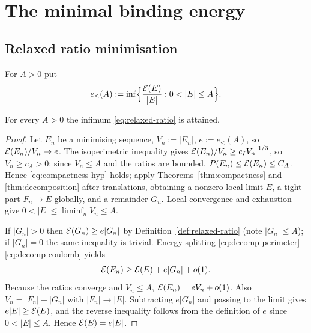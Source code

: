 \chapter{The minimal binding energy}\label{ch:binding}

\section{Relaxed ratio minimisation}

\begin{definition}\label{def:relaxed-ratio}
For $A>0$ put
\begin{equation}\label{eq:relaxed-ratio}
  e_\le(A):=\inf\Bigl\{\frac{\Ec(E)}{|E|}:0<|E|\le A\Bigr\}.
\end{equation}
\end{definition}

\begin{lemma}\label{lem:relaxed-attained}
For every $A>0$ the infimum \eqref{eq:relaxed-ratio} is attained.
\end{lemma}

\begin{proof}
Let $E_n$ be a minimising sequence, $V_n:=|E_n|$, $e:=e_\le(A)$, so
$\mathcal E(E_n)/V_n\to e$.  The isoperimetric inequality gives
$\mathcal E(E_n)/V_n\ge c_IV_n^{-1/3}$, so $V_n\ge c_A>0$; since $V_n\le A$ and the
ratios are bounded, $P(E_n)\le\mathcal E(E_n)\le C_A$.  Hence
\eqref{eq:compactness-hyp} holds; apply
Theorems~\ref{thm:compactness} and \ref{thm:decomposition} after translations,
obtaining a nonzero local limit $E$, a tight part $F_n\to E$ globally, and a
remainder $G_n$.  Local convergence and exhaustion give
$0<|E|\le\liminf_nV_n\le A$.

If $|G_n|>0$ then $\mathcal E(G_n)\ge e|G_n|$ by
Definition~\ref{def:relaxed-ratio} (note $|G_n|\le A$); if $|G_n|=0$ the same
inequality is trivial.  Energy splitting
\eqref{eq:decomp-perimeter}--\eqref{eq:decomp-coulomb} yields
\[
  \mathcal E(E_n)\ge\mathcal E(E)+e|G_n|+o(1).
\]
Because the ratios converge and $V_n\le A$, $\mathcal E(E_n)=eV_n+o(1)$.  Also
$V_n=|F_n|+|G_n|$ with $|F_n|\to|E|$.  Subtracting $e|G_n|$ and passing to the
limit gives $e|E|\ge\mathcal E(E)$, and the reverse inequality follows from the
definition of $e$ since $0<|E|\le A$.  Hence $\mathcal E(E)=e|E|$.
\end{proof}


